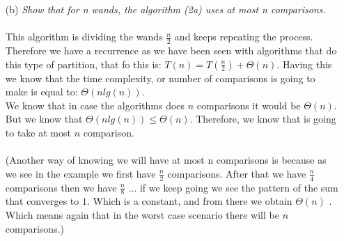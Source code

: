 \documentclass[11pt]{article} \setlength{\oddsidemargin}{0in}
\begin{document}
{\begin{enumerate}
\\
    
  
  \item[(b)]{\textit{Show that for n wands, the algorithm (2a) uses at  %
        most n comparisons.}}
    \\\\
    This algorithm is dividing the wands $\frac{n}{2}$ and keeps repeating the process. Therefore we have a recurrence as we have been seen with algorithms that do this type of partition, that fo this is: $T(n) = T(\frac{n}{2}) + \Theta(n)$. Having this we know that the time complexity, or number of comparisons is going to make is equal to: $\Theta(nlg(n))$. \\We know that in case the algorithms does $n$ comparisons it would be $\Theta(n)$. But we know that $\Theta(nlg(n)) \leq \Theta(n)$.  Therefore, we know that is going to take at most  $n$ comparison. \\\\
    (Another way of knowing we will have at most n comparisons is because as we see in the example we first have $\frac{n}{2}$ comparisons. After that we have $\frac{n}{4}$ comparisons then we have  $\frac{n}{8}$ ... if we keep going we see the pattern of the sum that converges to $1$. Which is a constant, and from there we obtain $\Theta(n)$ . Which means again that in the worst case scenario there will be $n$ comparisons.)\\
   

\end{enumerate}}
\end{document}
